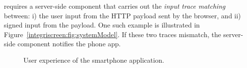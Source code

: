 \sysname requires a server-side component that carries out the \emph{input trace matching} between: i) the user input from the HTTP payload sent by the browser, and ii) signed input from the \sysname \tls payload. One such example is illustrated in Figure~\ref{integriscreen:fig:systemModel}. If these two traces mismatch, the \name server-side component notifies the \name phone app.



\begin{figure}[t]
	\captionsetup[subfigure]{justification=centering}
	\centering
	\null
	\hfill
	\hfill
	\hfill
	\null
	\caption[User experience of the smartphone application]{
		User experience of the smartphone application.
}
	\label{fig:userExperience}
\end{figure}




